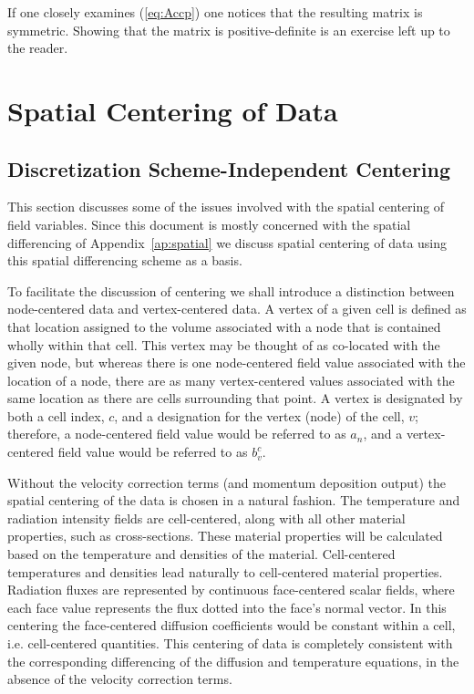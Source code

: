 \documentclass{article}
\begin{document}
If one closely examines (\ref{eq:Accp}) one notices that the resulting
matrix is symmetric.  Showing that the matrix is positive-definite is
an exercise left up to the reader.

\section{Spatial Centering of Data}

\subsection{Discretization Scheme-Independent Centering}

This section discusses some of the issues involved with the spatial
centering of field variables.
Since this document is mostly concerned with the spatial differencing of
Appendix~\ref{ap:spatial} we discuss spatial centering of data using
this spatial differencing scheme as a basis.

To facilitate the discussion of centering we shall introduce a distinction
between node-centered data and vertex-centered data.
A vertex of a given cell
is defined as that location assigned to the volume associated with
a node that is contained wholly within that cell.
This vertex may be thought of as co-located with the given node, but
whereas there is one node-centered field
value associated with the location of a node, there are as
many vertex-centered values associated with the same location as
there are cells surrounding that point.
A vertex is designated by both a cell index, $c$, and a designation
for the vertex (node) of the cell, $v$; therefore, a node-centered field value
would be referred to as $a_{n}$, and a vertex-centered field value
would be referred to as $b^{c}_{v}$.

Without the velocity correction terms (and momentum deposition output)
the spatial centering of the data is chosen in a natural fashion.
The temperature and radiation intensity fields are cell-centered,
along with all other material properties, such as cross-sections.
These material properties will be calculated based on the temperature
and densities of the material.
Cell-centered temperatures and densities lead naturally to cell-centered
material properties.
Radiation fluxes are represented by continuous face-centered scalar fields,
where each face value represents the flux dotted into the face's normal
vector.
In this centering the face-centered diffusion coefficients would be constant
within a cell, i.e. cell-centered quantities.
This centering of data is completely consistent with the
corresponding differencing of the diffusion and temperature equations,
in the absence of the velocity correction terms.
\end{document}
